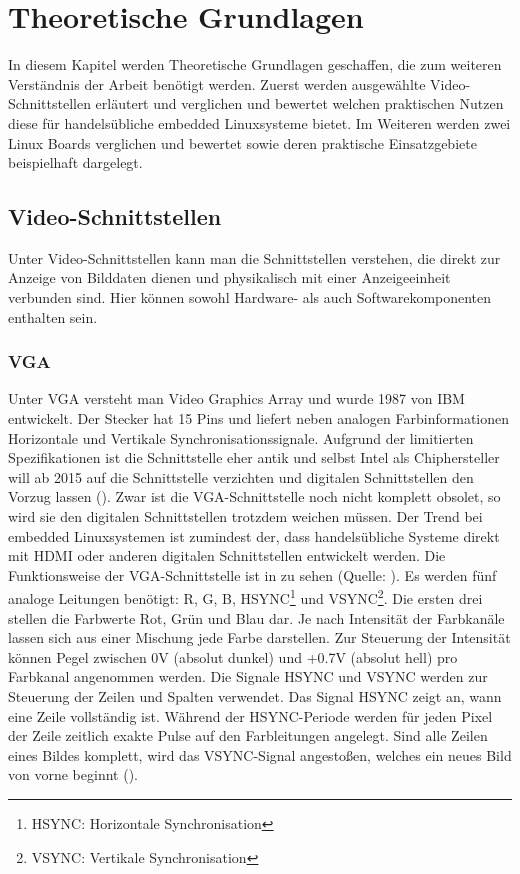 \chapter{Theoretische Grundlagen}
\label{cha:Grundlagen}
In diesem Kapitel werden Theoretische Grundlagen geschaffen, die zum weiteren Verständnis der Arbeit benötigt werden. Zuerst werden ausgewählte Video-Schnittstellen erläutert und verglichen und bewertet welchen praktischen Nutzen diese für handelsübliche embedded Linuxsysteme bietet. Im Weiteren werden zwei Linux Boards verglichen und bewertet sowie deren praktische Einsatzgebiete beispielhaft dargelegt.

\section{Video-Schnittstellen}
Unter Video-Schnittstellen kann man die Schnittstellen verstehen, die direkt zur Anzeige von Bilddaten dienen und physikalisch mit einer Anzeigeeinheit verbunden sind. Hier können sowohl Hardware- als auch Softwarekomponenten enthalten sein.
\subsection{VGA}
Unter VGA versteht man Video Graphics Array und wurde 1987 von IBM entwickelt. Der Stecker hat 15 Pins und liefert neben analogen Farbinformationen Horizontale und Vertikale Synchronisationssignale. Aufgrund der limitierten Spezifikationen ist die Schnittstelle eher antik und selbst Intel als Chiphersteller will ab 2015 auf die Schnittstelle verzichten  und digitalen Schnittstellen den Vorzug lassen (\cite{Intel2010}). Zwar ist die VGA-Schnittstelle noch nicht komplett obsolet, so wird sie den digitalen Schnittstellen trotzdem weichen müssen. Der Trend bei embedded Linuxsystemen ist zumindest der, dass handelsübliche Systeme direkt mit HDMI oder anderen digitalen Schnittstellen entwickelt werden.
Die Funktionsweise der VGA-Schnittstelle ist in  zu sehen (Quelle: \cite{Valcarce2011}). Es werden fünf analoge Leitungen benötigt: R, G, B, HSYNC\footnote{HSYNC: Horizontale Synchronisation} und VSYNC\footnote{VSYNC: Vertikale Synchronisation}. Die ersten drei stellen die Farbwerte Rot, Grün und Blau dar. Je nach Intensität der Farbkanäle lassen sich aus einer Mischung jede Farbe darstellen. Zur Steuerung der Intensität können Pegel zwischen 0V (absolut dunkel) und +0.7V (absolut hell) pro Farbkanal angenommen werden. Die Signale HSYNC und VSYNC werden zur Steuerung der Zeilen und Spalten verwendet. Das Signal HSYNC zeigt an, wann eine Zeile vollständig ist. Während der HSYNC-Periode werden für jeden Pixel der Zeile zeitlich exakte Pulse auf den Farbleitungen angelegt. Sind alle Zeilen eines Bildes komplett, wird das VSYNC-Signal angestoßen, welches ein neues Bild von vorne beginnt (\cite{Valcarce2011}).


